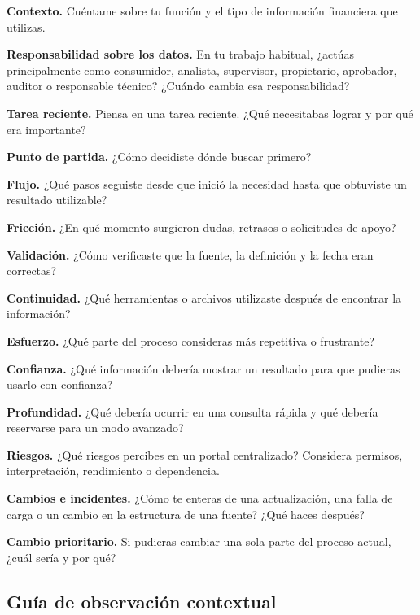 \begin{uxpreg}
\item \textbf{Contexto.} Cuéntame sobre tu función y el tipo de información financiera que
  utilizas.
\item \textbf{Responsabilidad sobre los datos.} En tu trabajo habitual, ¿actúas principalmente
  como consumidor, analista, supervisor, propietario, aprobador, auditor o responsable
  técnico? ¿Cuándo cambia esa responsabilidad?
\item \textbf{Tarea reciente.} Piensa en una tarea reciente. ¿Qué necesitabas lograr y por
  qué era importante?
\item \textbf{Punto de partida.} ¿Cómo decidiste dónde buscar primero?
\item \textbf{Flujo.} ¿Qué pasos seguiste desde que inició la necesidad hasta que obtuviste un
  resultado utilizable?
\item \textbf{Fricción.} ¿En qué momento surgieron dudas, retrasos o solicitudes de apoyo?
\item \textbf{Validación.} ¿Cómo verificaste que la fuente, la definición y la fecha eran
  correctas?
\item \textbf{Continuidad.} ¿Qué herramientas o archivos utilizaste después de encontrar la
  información?
\item \textbf{Esfuerzo.} ¿Qué parte del proceso consideras más repetitiva o frustrante?
\item \textbf{Confianza.} ¿Qué información debería mostrar un resultado para que pudieras
  usarlo con confianza?
\item \textbf{Profundidad.} ¿Qué debería ocurrir en una consulta rápida y qué debería
  reservarse para un modo avanzado?
\item \textbf{Riesgos.} ¿Qué riesgos percibes en un portal centralizado? Considera permisos,
  interpretación, rendimiento o dependencia.
\item \textbf{Cambios e incidentes.} ¿Cómo te enteras de una actualización, una falla de carga
  o un cambio en la estructura de una fuente? ¿Qué haces después?
\item \textbf{Cambio prioritario.} Si pudieras cambiar una sola parte del proceso actual,
  ¿cuál sería y por qué?
\end{uxpreg}

\subsection{Guía de observación contextual}

